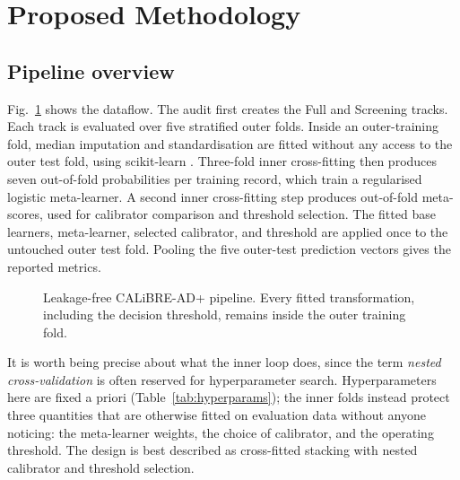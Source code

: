 \documentclass[conference]{IEEEtran}
\begin{document}
\section{Proposed Methodology}
\label{sec:methodology}
\subsection{Pipeline overview}
Fig.~\ref{fig:pipeline} shows the dataflow. The audit first creates the Full and Screening tracks. Each track is evaluated over five stratified outer folds. Inside an outer-training fold, median imputation and standardisation are fitted without any access to the outer test fold, using scikit-learn \cite{b16}. Three-fold inner cross-fitting then produces seven out-of-fold probabilities per training record, which train a regularised logistic meta-learner. A second inner cross-fitting step produces out-of-fold meta-scores, used for calibrator comparison and threshold selection. The fitted base learners, meta-learner, selected calibrator, and threshold are applied once to the untouched outer test fold. Pooling the five outer-test prediction vectors gives the reported metrics.

\begin{figure}[!t]
\centering
{}
\caption{Leakage-free CALiBRE-AD+ pipeline. Every fitted transformation, including the decision threshold, remains inside the outer training fold.}
\label{fig:pipeline}
\end{figure}

It is worth being precise about what the inner loop does, since the term \emph{nested cross-validation} is often reserved for hyperparameter search. Hyperparameters here are fixed a priori (Table~\ref{tab:hyperparams}); the inner folds instead protect three quantities that are otherwise fitted on evaluation data without anyone noticing: the meta-learner weights, the choice of calibrator, and the operating threshold. The design is best described as cross-fitted stacking with nested calibrator and threshold selection.
\end{document}
